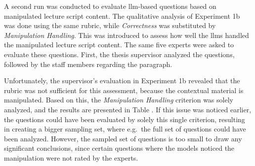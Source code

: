  A second run was conducted to evaluate \ac{llm}-based questions based on manipulated lecture script content. The qualitative analysis of Experiment 1b was done using the same rubric, while \textit{Correctness} was substituted by \textit{Manipulation Handling}. This was introduced to assess how well the \acp{llm} handled the manipulated lecture script content. The same five experts were asked to evaluate these questions. First, the thesis supervisor analyzed the questions, followed by the staff members regarding the  paragraph.

Unfortunately, the supervisor's evaluation in Experiment 1b revealed that the rubric was not sufficient for this assessment, because the contextual material is manipulated. Based on this, the \textit{Manipulation Handling} criterion was solely analyzed, and the results are presented in Table . If this issue was noticed earlier, the questions could have been evaluated by solely this single criterion, resulting in creating a bigger sampling set, where e.g.\ the full set of questions could have been analyzed. However, the sampled set of questions is too small to draw any significant conclusions, since certain questions where the models noticed the manipulation were not rated by the experts.

\begin{table}[htbp]
    \centering
    \caption{Supervisor-based Manipulation Handling Analysis by LLM and Prompt Type (Exp1b).}
    \label{tab:exp1b-manipulation-handling-supervisor}
\end{table}

